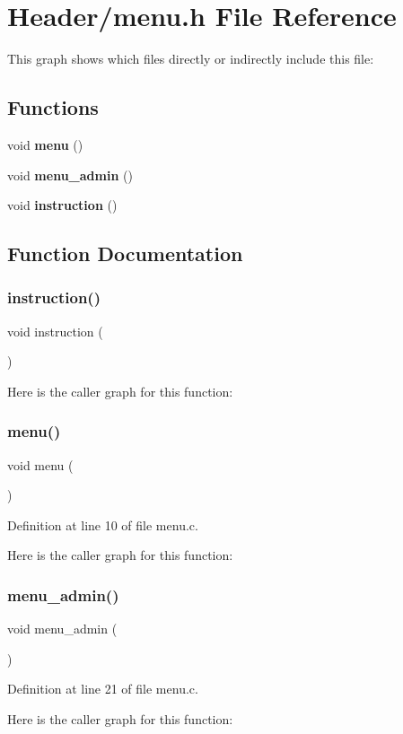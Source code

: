 \section{Header/menu.h File Reference}
\label{menu_8h}
This graph shows which files directly or indirectly include this file\+:
\subsection*{Functions}
\begin{DoxyCompactItemize}
\item 
void \textbf{ menu} ()
\item 
void \textbf{ menu\+\_\+admin} ()
\item 
void \textbf{ instruction} ()
\end{DoxyCompactItemize}


\subsection{Function Documentation}
\mbox{\label{menu_8h_a1a117be04e7a04994d9d89038cb6c81e}} 
\subsubsection{instruction()}
{\footnotesize\ttfamily void instruction (\begin{DoxyParamCaption}{ }\end{DoxyParamCaption})}

Here is the caller graph for this function\+:
\mbox{\label{menu_8h_a2a0e843767aeea4f433a28b9c54f573a}} 
\subsubsection{menu()}
{\footnotesize\ttfamily void menu (\begin{DoxyParamCaption}{ }\end{DoxyParamCaption})}



Definition at line 10 of file menu.\+c.

Here is the caller graph for this function\+:
\mbox{\label{menu_8h_a00990449875fc238baa27ecdb95d24b6}} 
\subsubsection{menu\+\_\+admin()}
{\footnotesize\ttfamily void menu\+\_\+admin (\begin{DoxyParamCaption}{ }\end{DoxyParamCaption})}



Definition at line 21 of file menu.\+c.

Here is the caller graph for this function\+:
